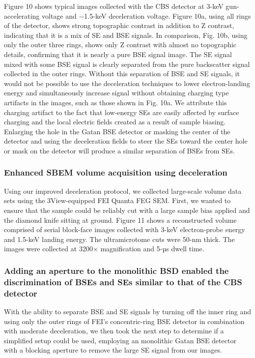 \documentclass{article}
\begin{document}
Figure 10 shows typical images collected with the CBS detector at 3-keV gun-accelerating voltage and −1.5-keV deceleration voltage. Figure 10a, using all rings of the detector, shows strong topographic contrast in addition to Z contrast, indicating that it is a mix of SE and BSE signals. In comparison, Fig. 10b, using only the outer three rings, shows only Z contrast with almost no topographic details, confirming that it is nearly a pure BSE signal image. The SE signal mixed with some BSE signal is clearly separated from the pure backscatter signal collected in the outer rings. Without this separation of BSE and SE signals, it would not be possible to use the deceleration techniques to lower electron-landing energy and simultaneously increase signal without obtaining charging type artifacts in the images, such as those shown in Fig. 10a. We attribute this charging artifact to the fact that low-energy SEs are easily affected by surface charging and the local electric fields created as a result of sample biasing. Enlarging the hole in the Gatan BSE detector or masking the center of the detector and using the deceleration fields to steer the SEs toward the center hole or mask on the detector will produce a similar separation of BSEs from SEs.

\subsubsection*{Enhanced SBEM volume acquisition using deceleration}
Using our improved deceleration protocol, we collected large-scale volume data sets using the 3View-equipped FEI Quanta FEG SEM. First, we wanted to ensure that the sample could be reliably cut with a large sample bias applied and the diamond knife sitting at ground. Figure 11 shows a reconstructed volume comprised of serial block-face images collected with 3-keV electron-probe energy and 1.5-keV landing energy. The ultramicrotome cuts were 50-nm thick. The images were collected at 3200× magnification and 5-µs dwell time.

\subsubsection*{Adding an aperture to the monolithic BSD enabled the discrimination of BSEs and SEs similar to that of the CBS detector}
With the ability to separate BSE and SE signals by turning off the inner ring and using only the outer rings of FEI’s concentric-ring BSE detector in combination with moderate deceleration, we then took the next step to determine if a simplified setup could be used, employing an monolithic Gatan BSE detector with a blocking aperture to remove the large SE signal from our images.
\end{document}
